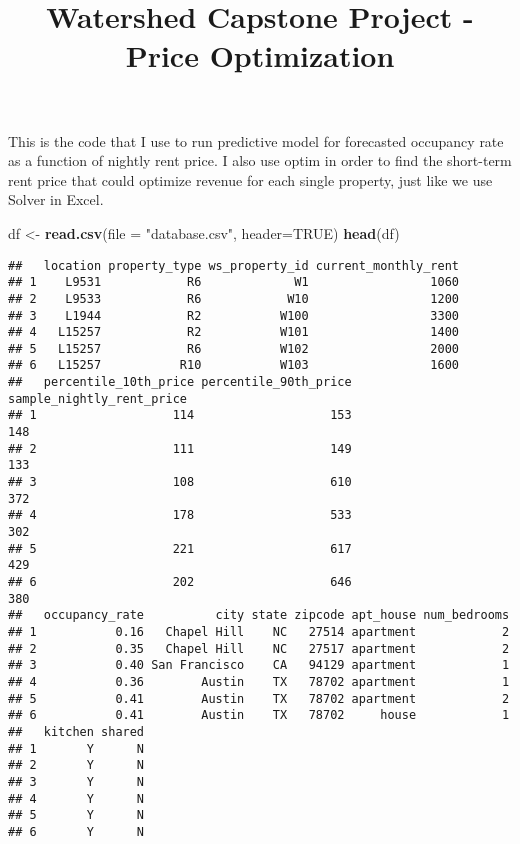 \documentclass[]{article}
\title{Watershed Capstone Project - Price Optimization}
\author{}
\date{}
\newenvironment{Shaded}{\begin{snugshade}}{\end{snugshade}}
\newcommand{\DataTypeTok}[1]{\textcolor[rgb]{0.13,0.29,0.53}{#1}}
\newcommand{\KeywordTok}[1]{\textcolor[rgb]{0.13,0.29,0.53}{\textbf{#1}}}
\newcommand{\NormalTok}[1]{#1}
\newcommand{\OtherTok}[1]{\textcolor[rgb]{0.56,0.35,0.01}{#1}}
\newcommand{\StringTok}[1]{\textcolor[rgb]{0.31,0.60,0.02}{#1}}
\begin{document}
\maketitle

This is the code that I use to run predictive model for forecasted
occupancy rate as a function of nightly rent price. I also use optim in
order to find the short-term rent price that could optimize revenue for
each single property, just like we use Solver in Excel.

\begin{Shaded}
\begin{Highlighting}[]
\NormalTok{df <-}\StringTok{ }\KeywordTok{read.csv}\NormalTok{(}\DataTypeTok{file =} \StringTok{"database.csv"}\NormalTok{, }\DataTypeTok{header=}\OtherTok{TRUE}\NormalTok{)}
\KeywordTok{head}\NormalTok{(df)}
\end{Highlighting}
\end{Shaded}

\begin{verbatim}
##   location property_type ws_property_id current_monthly_rent
## 1    L9531            R6             W1                 1060
## 2    L9533            R6            W10                 1200
## 3    L1944            R2           W100                 3300
## 4   L15257            R2           W101                 1400
## 5   L15257            R6           W102                 2000
## 6   L15257           R10           W103                 1600
##   percentile_10th_price percentile_90th_price sample_nightly_rent_price
## 1                   114                   153                       148
## 2                   111                   149                       133
## 3                   108                   610                       372
## 4                   178                   533                       302
## 5                   221                   617                       429
## 6                   202                   646                       380
##   occupancy_rate          city state zipcode apt_house num_bedrooms
## 1           0.16   Chapel Hill    NC   27514 apartment            2
## 2           0.35   Chapel Hill    NC   27517 apartment            2
## 3           0.40 San Francisco    CA   94129 apartment            1
## 4           0.36        Austin    TX   78702 apartment            1
## 5           0.41        Austin    TX   78702 apartment            2
## 6           0.41        Austin    TX   78702     house            1
##   kitchen shared
## 1       Y      N
## 2       Y      N
## 3       Y      N
## 4       Y      N
## 5       Y      N
## 6       Y      N
\end{verbatim}
\end{document}
